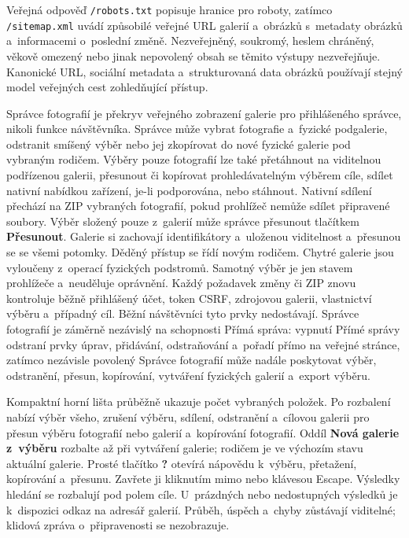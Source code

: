 \documentclass[11pt,a4paper]{article}
\newcommand{\ui}[1]{\textbf{#1}}
\newcommand{\codeword}[1]{\nolinkurl{#1}}
\begin{document}
Veřejná odpověď \codeword{/robots.txt} popisuje hranice pro roboty, zatímco
\codeword{/sitemap.xml} uvádí způsobilé veřejné URL galerií a~obrázků s~metadaty
obrázků a~informacemi o~poslední změně. Nezveřejněný, soukromý, heslem chráněný,
věkově omezený nebo jinak nepovolený obsah se těmito výstupy nezveřejňuje.
Kanonické URL, sociální metadata a~strukturovaná data obrázků používají stejný
model veřejných cest zohledňující přístup.

Správce fotografií je překryv veřejného zobrazení galerie pro přihlášeného
správce, nikoli funkce návštěvníka. Správce může vybrat fotografie a~fyzické
podgalerie, odstranit smíšený výběr nebo jej zkopírovat do nové fyzické galerie
pod vybraným rodičem. Výběry pouze fotografií lze také přetáhnout na viditelnou
podřízenou galerii, přesunout či kopírovat prohledávatelným výběrem cíle, sdílet
nativní nabídkou zařízení, je-li podporována, nebo stáhnout. Nativní sdílení
přechází na ZIP vybraných fotografií, pokud prohlížeč nemůže sdílet připravené
soubory. Výběr složený pouze z~galerií může správce přesunout tlačítkem
\ui{Přesunout}. Galerie si zachovají identifikátory a~uloženou viditelnost
a~přesunou se se všemi potomky. Děděný přístup se řídí novým rodičem.
Chytré galerie jsou vyloučeny z~operací fyzických podstromů. Samotný
výběr je jen stavem prohlížeče a~neuděluje oprávnění. Každý požadavek změny či
ZIP znovu kontroluje běžně přihlášený účet, token CSRF, zdrojovou galerii,
vlastnictví výběru a~případný cíl. Běžní návštěvníci tyto prvky nedostávají.
Správce fotografií je záměrně nezávislý na schopnosti Přímá správa: vypnutí
Přímé správy odstraní prvky úprav, přidávání, odstraňování a~pořadí přímo na
veřejné stránce, zatímco nezávisle povolený Správce fotografií může nadále
poskytovat výběr, odstranění, přesun, kopírování, vytváření fyzických galerií
a~export výběru.

Kompaktní horní lišta průběžně ukazuje počet vybraných položek. Po rozbalení
nabízí výběr všeho, zrušení výběru, sdílení, odstranění a~cílovou galerii
pro přesun výběru fotografií nebo galerií a~kopírování fotografií.
Oddíl \ui{Nová galerie z~výběru}
rozbalte až při vytváření galerie; rodičem je ve výchozím stavu aktuální
galerie.
Prosté tlačítko \ui{?} otevírá nápovědu k~výběru, přetažení, kopírování
a~přesunu. Zavřete ji kliknutím mimo nebo klávesou Escape. Výsledky hledání
se rozbalují pod polem cíle. U~prázdných nebo nedostupných výsledků je
k~dispozici odkaz na adresář galerií. Průběh,
úspěch a~chyby zůstávají viditelné; klidová zpráva o~připravenosti se
nezobrazuje.
\end{document}
